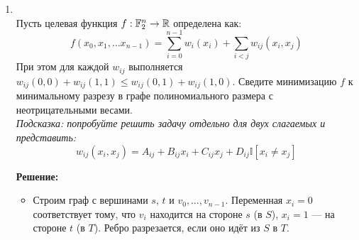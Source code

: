 \begin{enumerate}
\begin{enumerate}
\begin{itemize}
          \item Восстановление самого разреза: берём $t^* = \arg\min_t \mathrm{maxflow}(s,t)$,
          ищем минимальный $s$-$t^*$ разрез стандартным образом (обход в остаточном графе).
        \end{itemize}

      \item $\O(E^2)$.

        \textbf{Решение:}

        \begin{itemize}
          \item Используем тот же подход, но применяем более простой алгоритм поиска потока: \emph{поиск увеличивающих путей обходом в ширину} (BFS), каждый из которых находится за $\O(V + E) = \O(E)$ и увеличивает поток на $1$.

          \item Для фиксированной пары $(s, t)$ значение потока не превосходит $\deg(s)$ (так как все рёбра, смежные с $s$, имеют пропускную способность $1$). Значит, поиск потока от $s$ до $t$ занимает не более $\deg(s)$ итераций BFS, каждая за $\O(E)$: итого $\O(\deg(s) \cdot E)$.

          \item Суммируя по всем $V - 1$ вершинам $t$:
          $$\O\!\left((V-1) \cdot \deg(s) \cdot E\right).$$
          Нужно выбрать $s$ с минимальной степенью: $\deg(s) \le 2E / V$. Тогда:
          $$\O\!\left(V \cdot \frac{E}{V} \cdot E\right) = \O(E^2).$$
        \end{itemize}
    \end{enumerate}

  \item {} \\
    Пусть целевая функция $f : \mathbb{F}_2^n \rightarrow \mathbb{R}$ определена как:
    $$f(x_0, x_1, \dots x_{n-1}) = \sum_{i = 0}^{n - 1} w_i(x_i) + \sum_{i < j} w_{ij}(x_i, x_j)$$
    При этом для каждой $w_{ij}$ выполняется $w_{ij}(0, 0) + w_{ij}(1, 1) \le w_{ij}(0, 1) + w_{ij}(1, 0)$.
    Сведите минимизацию $f$ к минимальному разрезу в графе полиномиального размера с неотрицательными весами. \\
    \textit{Подсказка: попробуйте решить задачу отдельно для двух слагаемых и представить:}
    $$ w_{ij}(x_i, x_j) = A_{ij} + B_{ij} x_i + C_{ij} x_j + D_{ij} \mathbb{I}[ x_i \ne x_j ] $$

    \textbf{Решение:}

    \begin{itemize}
      \item Строим граф с вершинами $s$, $t$ и $v_0, \ldots, v_{n-1}$.
      Переменная $x_i = 0$ соответствует тому, что $v_i$ находится на стороне $s$ (в $S$),
      $x_i = 1$ --- на стороне $t$ (в $T$). Ребро разрезается, если оно идёт из $S$ в $T$.


\end{itemize}
\end{enumerate}
